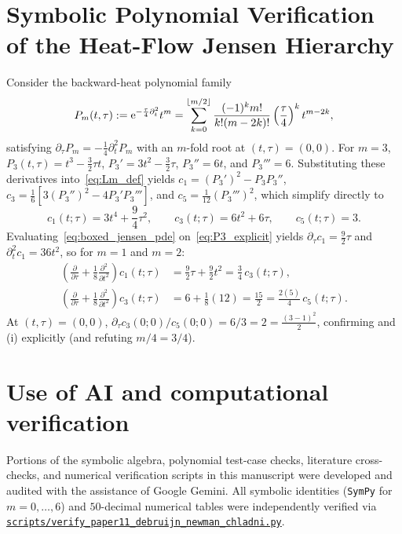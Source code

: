 \documentclass[11pt,reqno]{amsart}
\theoremstyle{plain}
\theoremstyle{definition}
\theoremstyle{remark}
\numberwithin{equation}{section}
\newcommand{\ee}{\mathrm{e}}
\newcommand{\fac}{\mathclose{\mathchar"0021}}
\begin{document}
\appendix

\section{Symbolic Polynomial Verification of the Heat-Flow Jensen Hierarchy}\label{app:poly_test}

Consider the backward-heat polynomial family
\[
P_m(t,\tau) := \ee^{-\frac{\tau}{4}\partial_t^2}t^m = \sum_{k=0}^{\lfloor m/2\rfloor} \frac{(-1)^k m\fac}{k\fac(m-2k)\fac}\left(\frac{\tau}{4}\right)^k t^{m-2k},
\]
satisfying $\partial_\tau P_m = -\frac{1}{4}\partial_t^2 P_m$ with an $m$-fold root at $(t,\tau) = (0,0)$. For $m = 3$, $P_3(t,\tau) = t^3 - \frac{3}{2}\tau t$, $P_3' = 3t^2 - \frac{3}{2}\tau$, $P_3'' = 6t$, and $P_3''' = 6$. Substituting these derivatives into~\eqref{eq:Lm_def} yields $c_1 = (P_3')^2 - P_3 P_3''$, $c_3 = \frac{1}{6}[3(P_3'')^2 - 4P_3' P_3''']$, and $c_5 = \frac{1}{12}(P_3''')^2$, which simplify directly to
\begin{equation}\label{eq:P3_explicit}
c_1(t;\tau) = 3t^4 + \frac{9}{4}\tau^2, \qquad c_3(t;\tau) = 6t^2 + 6\tau, \qquad c_5(t;\tau) = 3.
\end{equation}
Evaluating~\eqref{eq:boxed_jensen_pde} on~\eqref{eq:P3_explicit} yields $\partial_\tau c_1 = \frac{9}{2}\tau$ and $\partial_t^2 c_1 = 36t^2$, so for $m = 1$ and $m = 2$:
\begin{align}\label{eq:P3_check_m1}
\left(\frac{\partial}{\partial\tau} + \frac{1}{8}\frac{\partial^2}{\partial t^2}\right)c_1(t;\tau) &= \frac{9}{2}\tau + \frac{9}{2}t^2 = \frac{3}{4}\,c_3(t;\tau), \\
\left(\frac{\partial}{\partial\tau} + \frac{1}{8}\frac{\partial^2}{\partial t^2}\right)c_3(t;\tau) &= 6 + \frac{1}{8}(12) = \frac{15}{2} = \frac{2(5)}{4}\,c_5(t;\tau).\label{eq:P3_check_m2}
\end{align}
At $(t,\tau) = (0,0)$, $\partial_\tau c_3(0;0) / c_5(0;0) = 6 / 3 = 2 = \frac{(3 - 1)^2}{2}$, confirming  and (i) explicitly (and refuting $m/4 = 3/4$).

\section*{Use of AI and computational verification}

Portions of the symbolic algebra, polynomial test-case checks, literature cross-checks, and numerical verification scripts in this manuscript were developed and audited with the assistance of Google Gemini. All symbolic identities (\texttt{SymPy} for $m = 0,\dots,6$) and $50$-decimal numerical tables were independently verified via \href{https://github.com/thijsmissiaen/paper11-debruijn-newman-chladni-evolution/blob/main/scripts/verify_paper11_debruijn_newman_chladni.py}{\texttt{scripts/verify\_\allowbreak paper11\_\allowbreak debruijn\_\allowbreak newman\_\allowbreak chladni.py}}.
\end{document}
